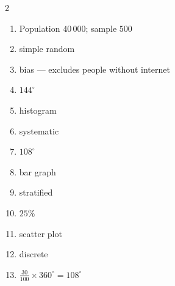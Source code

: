\documentclass[11pt]{article}
\begin{document}
\begin{keybox}
\begin{multicols}{2}
\small
\begin{enumerate}[leftmargin=*,itemsep=3pt]
  \item Population $40\,000$; sample $500$
  \item simple random
  \item bias — excludes people without internet
  \item $144^\circ$
  \item histogram
  \item systematic
  \item $108^\circ$
  \item bar graph
  \item stratified
  \item $25\%$
  \item scatter plot
  \item discrete
  \item $\tfrac{30}{100}\times360^\circ=108^\circ$
\end{enumerate}
\end{multicols}
\end{keybox}
\end{document}

